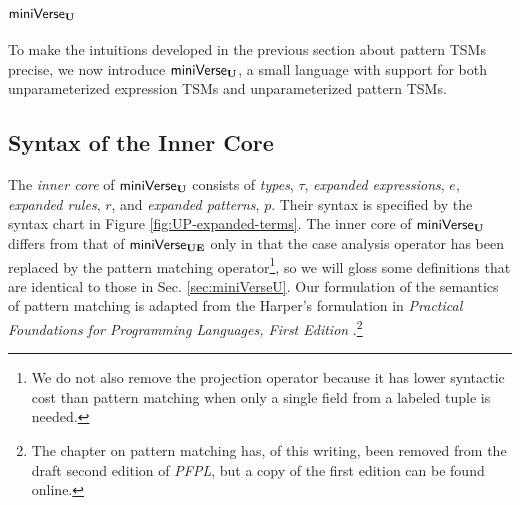 {{{{\section{\texorpdfstring{$\mathsf{miniVerse}_\textbf{U}$}{miniVerseU}}\label{sec:miniVerseUP}
To make the intuitions developed in the previous section about pattern TSMs precise, we  now introduce $\mathsf{miniVerse}_\textbf{U}$, a small language with support for both unparameterized expression TSMs and unparameterized pattern TSMs.
\subsection{Syntax of the Inner Core}\label{sec:UP-expanded-terms}
The \emph{inner core} of $\mathsf{miniVerse}_\textbf{U}$ consists of \emph{types}, $\tau$, \emph{expanded expressions}, $e$, \emph{expanded rules}, $r$, and \emph{expanded patterns}, $p$. Their syntax is specified by the syntax chart in Figure \ref{fig:UP-expanded-terms}. The inner core of $\mathsf{miniVerse}_\textbf{U}$ differs from that of $\mathsf{miniVerse}_\textbf{UE}$  only in that the case analysis operator has been replaced by the pattern matching operator\footnote{We do not also remove the projection operator because it has lower syntactic cost than pattern matching when only a single field from a labeled tuple is needed.}, so we will gloss some definitions that are identical to those in Sec. \ref{sec:miniVerseU}. Our formulation of the semantics of pattern matching is adapted from the Harper's formulation in \emph{Practical Foundations for Programming Languages, First Edition} \cite{pfple1}.\footnote{The chapter on pattern matching has, of this writing, been removed from the draft second edition of \emph{PFPL}, but a copy of the first edition can be found online.}

}}}}
